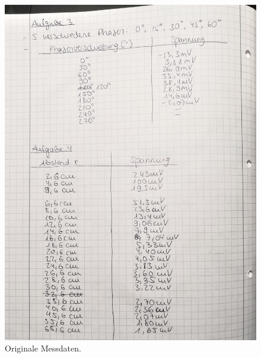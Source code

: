 \begin{figure}[h!tbp]
	\centering
	\includegraphics[width=0.9\linewidth]{Messdaten2.jpg}
	\caption{Originale Messdaten. }
\end{figure}